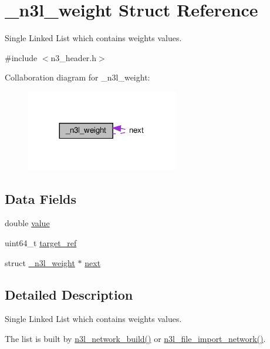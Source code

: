 \hypertarget{struct__n3l__weight}{}\section{\+\_\+n3l\+\_\+weight Struct Reference}
\label{struct__n3l__weight}


Single Linked List which contains weight\textquotesingle{}s values.  




{\ttfamily \#include $<$n3\+\_\+header.\+h$>$}



Collaboration diagram for \+\_\+n3l\+\_\+weight\+:\nopagebreak
\begin{figure}[H]
\begin{center}
\leavevmode
\includegraphics[width=188pt]{struct__n3l__weight__coll__graph}
\end{center}
\end{figure}
\subsection*{Data Fields}
\begin{DoxyCompactItemize}
\item 
double \hyperlink{struct__n3l__weight_a1d1ebc5e04ba1dd26094993dd94aa710}{value}
\item 
uint64\+\_\+t \hyperlink{struct__n3l__weight_ac5094b52f09a092ffb1cdc4cc594f38f}{target\+\_\+ref}
\item 
struct \hyperlink{struct__n3l__weight}{\+\_\+n3l\+\_\+weight} $\ast$ \hyperlink{struct__n3l__weight_adf96faae4820538377678c82ec96d48e}{next}
\end{DoxyCompactItemize}


\subsection{Detailed Description}
Single Linked List which contains weight\textquotesingle{}s values. 

The list is built by \hyperlink{n3__network_8c_a5f87e1efebd658dd55d7d2ca1768bdba}{n3l\+\_\+network\+\_\+build()} or \hyperlink{n3__file_8c_a4fef76548ed87845dceafaa9527a83d0}{n3l\+\_\+file\+\_\+import\+\_\+network()}.

